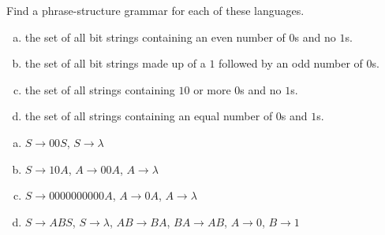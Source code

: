 \documentclass[../main.tex]{subfiles}
\begin{document}
Find a phrase-structure grammar for each of these languages.
\begin{enumerate}[a)]
	\item the set of all bit strings containing an even number of $0$s and no $1$s.
	\item the set of all bit strings made up of a $1$ followed by an odd number of $0$s.
	\setcounter{enumi}{3}
	\item the set of all strings containing $10$ or more $0$s and no $1$s.
	\setcounter{enumi}{5}
	\item the set of all strings containing an equal number of $0$s and $1$s.
\end{enumerate}

\solution
\begin{enumerate}[a)]
	\item $S \rightarrow 00S$, $S \rightarrow \lambda$
	\item $S \rightarrow 10A$, $A \rightarrow 00A$, $A \rightarrow \lambda$
	\setcounter{enumi}{3}
	\item $S \rightarrow 0000000000A$, $A \rightarrow 0A$, $A \rightarrow \lambda$
	\setcounter{enumi}{5}
	\item $S \rightarrow ABS$, $S \rightarrow \lambda$, $AB \rightarrow BA$, $BA \rightarrow AB$, $A \rightarrow 0$, $B \rightarrow 1$
\end{enumerate}
\end{document}
